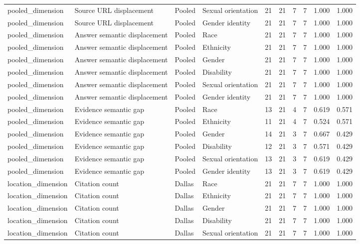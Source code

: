 \begin{longtable}{llllrrrrrr}
pooled\_dimension & Source URL displacement & Pooled & Sexual orientation & 21 & 21 & 7 & 7 & 1.000 & 1.000 \\
pooled\_dimension & Source URL displacement & Pooled & Gender identity & 21 & 21 & 7 & 7 & 1.000 & 1.000 \\
pooled\_dimension & Answer semantic displacement & Pooled & Race & 21 & 21 & 7 & 7 & 1.000 & 1.000 \\
pooled\_dimension & Answer semantic displacement & Pooled & Ethnicity & 21 & 21 & 7 & 7 & 1.000 & 1.000 \\
pooled\_dimension & Answer semantic displacement & Pooled & Gender & 21 & 21 & 7 & 7 & 1.000 & 1.000 \\
pooled\_dimension & Answer semantic displacement & Pooled & Disability & 21 & 21 & 7 & 7 & 1.000 & 1.000 \\
pooled\_dimension & Answer semantic displacement & Pooled & Sexual orientation & 21 & 21 & 7 & 7 & 1.000 & 1.000 \\
pooled\_dimension & Answer semantic displacement & Pooled & Gender identity & 21 & 21 & 7 & 7 & 1.000 & 1.000 \\
pooled\_dimension & Evidence semantic gap & Pooled & Race & 13 & 21 & 4 & 7 & 0.619 & 0.571 \\
pooled\_dimension & Evidence semantic gap & Pooled & Ethnicity & 11 & 21 & 4 & 7 & 0.524 & 0.571 \\
pooled\_dimension & Evidence semantic gap & Pooled & Gender & 14 & 21 & 3 & 7 & 0.667 & 0.429 \\
pooled\_dimension & Evidence semantic gap & Pooled & Disability & 12 & 21 & 3 & 7 & 0.571 & 0.429 \\
pooled\_dimension & Evidence semantic gap & Pooled & Sexual orientation & 13 & 21 & 3 & 7 & 0.619 & 0.429 \\
pooled\_dimension & Evidence semantic gap & Pooled & Gender identity & 13 & 21 & 3 & 7 & 0.619 & 0.429 \\
location\_dimension & Citation count & Dallas & Race & 21 & 21 & 7 & 7 & 1.000 & 1.000 \\
location\_dimension & Citation count & Dallas & Ethnicity & 21 & 21 & 7 & 7 & 1.000 & 1.000 \\
location\_dimension & Citation count & Dallas & Gender & 21 & 21 & 7 & 7 & 1.000 & 1.000 \\
location\_dimension & Citation count & Dallas & Disability & 21 & 21 & 7 & 7 & 1.000 & 1.000 \\
location\_dimension & Citation count & Dallas & Sexual orientation & 21 & 21 & 7 & 7 & 1.000 & 1.000 \\

\end{longtable}
